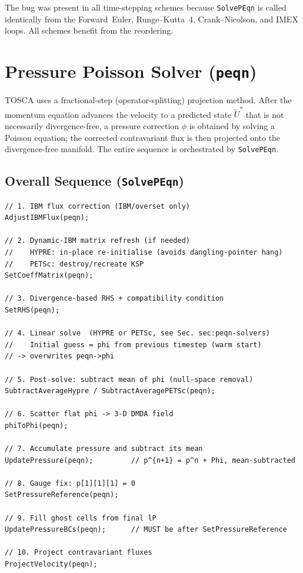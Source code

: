 \documentclass[12pt,a4paper]{article}
\begin{document}
\begin{warnbox}
The bug was present in all time-stepping schemes because
\texttt{SolvePEqn} is called identically from the Forward~Euler,
Runge--Kutta~4, Crank--Nicolson, and IMEX loops.  All schemes benefit
from the reordering.
\end{warnbox}

\section{Pressure Poisson Solver (\texttt{peqn})}
\label{sec:peqn}

TOSCA uses a fractional-step (operator-splitting) projection method.
After the momentum equation advances the velocity to a predicted state
$\widetilde{U}^*$ that is not necessarily divergence-free, a pressure
correction $\phi$ is obtained by solving a Poisson equation; the
corrected contravariant flux is then projected onto the divergence-free
manifold.  The entire sequence is orchestrated by \texttt{SolvePEqn}.

\subsection{Overall Sequence (\texttt{SolvePEqn})}
\label{sec:peqn-sequence}

\begin{lstlisting}[caption={Body of \texttt{SolvePEqn} (\texttt{src/peqn.c}).},
                   label=lst:solvePEqn]
// 1. IBM flux correction (IBM/overset only)
AdjustIBMFlux(peqn);

// 2. Dynamic-IBM matrix refresh (if needed)
//    HYPRE: in-place re-initialise (avoids dangling-pointer hang)
//    PETSc: destroy/recreate KSP
SetCoeffMatrix(peqn);

// 3. Divergence-based RHS + compatibility condition
SetRHS(peqn);

// 4. Linear solve  (HYPRE or PETSc, see Sec. sec:peqn-solvers)
//    Initial guess = phi from previous timestep (warm start)
// -> overwrites peqn->phi

// 5. Post-solve: subtract mean of phi (null-space removal)
SubtractAverageHypre / SubtractAveragePETSc(peqn);

// 6. Scatter flat phi -> 3-D DMDA field
phiToPhi(peqn);

// 7. Accumulate pressure and subtract its mean
UpdatePressure(peqn);         // p^{n+1} = p^n + Phi, mean-subtracted

// 8. Gauge fix: p[1][1][1] = 0
SetPressureReference(peqn);

// 9. Fill ghost cells from final lP
UpdatePressureBCs(peqn);      // MUST be after SetPressureReference

// 10. Project contravariant fluxes
ProjectVelocity(peqn);
\end{lstlisting}
\end{document}
